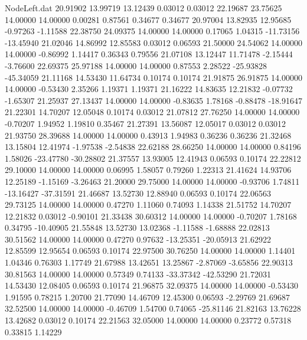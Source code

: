 \begin{filecontents}{NodeLeft.dat}
  20.91902   13.99719   13.12439     0.03012    0.03012   22.19687   23.75625   14.00000   14.00000    0.00281    0.87561    0.34677    0.34677
  20.97004   13.82935   12.95685    -0.97263   -1.11588   22.38750   24.09375   14.00000   14.00000    0.17065    1.04315  -11.73156  -13.45940
  21.02046   14.86992   12.85583     0.03012    0.06593   21.50000   24.54062   14.00000   14.00000   -0.86992    1.14417    0.36343    0.79556
  21.07108   13.12447   11.71478    -2.15444   -3.76600   22.69375   25.97188   14.00000   14.00000    0.87553    2.28522  -25.93828  -45.34059
  21.11168   14.53430   11.64734     0.10174    0.10174   21.91875   26.91875   14.00000   14.00000   -0.53430    2.35266    1.19371    1.19371
  21.16222   14.83635   12.21832    -0.07732   -1.65307   21.25937   27.13437   14.00000   14.00000   -0.83635    1.78168   -0.88478  -18.91647
  21.22301   14.70207   12.05048     0.10174    0.03012   21.07812   27.76250   14.00000   14.00000   -0.70207    1.94952    1.19810    0.35467
  21.27391   13.56087   12.05017     0.03012    0.03012   21.93750   28.39688   14.00000   14.00000    0.43913    1.94983    0.36236    0.36236
  21.32468   13.15804   12.41974    -1.97538   -2.54838   22.62188   28.66250   14.00000   14.00000    0.84196    1.58026  -23.47780  -30.28802
  21.37557   13.93005   12.41943     0.06593    0.10174   22.22812   29.10000   14.00000   14.00000    0.06995    1.58057    0.79260    1.22313
  21.41624   14.93706   12.25189    -1.15169   -3.26463   21.20000   29.75000   14.00000   14.00000   -0.93706    1.74811  -13.16427  -37.31591
  21.46687   13.52730   12.88940     0.06593    0.10174   22.06563   29.73125   14.00000   14.00000    0.47270    1.11060    0.74093    1.14338
  21.51752   14.70207   12.21832     0.03012   -0.90101   21.33438   30.60312   14.00000   14.00000   -0.70207    1.78168    0.34795  -10.40905
  21.55848   13.52730   13.02368    -1.11588   -1.68888   22.02813   30.51562   14.00000   14.00000    0.47270    0.97632  -13.25351  -20.05913
  21.62922   12.85599   12.95654     0.06593    0.10174   22.97500   30.76250   14.00000   14.00000    1.14401    1.04346    0.76303    1.17749
  21.67988   13.42651   13.25867    -2.87069   -3.65856   22.90313   30.81563   14.00000   14.00000    0.57349    0.74133  -33.37342  -42.53290
  21.72031   14.53430   12.08405     0.06593    0.10174   21.96875   32.09375   14.00000   14.00000   -0.53430    1.91595    0.78215    1.20700
  21.77090   14.46709   12.45300     0.06593   -2.29769   21.69687   32.52500   14.00000   14.00000   -0.46709    1.54700    0.74065  -25.81146
  21.82163   13.76228   13.42682     0.03012    0.10174   22.21563   32.05000   14.00000   14.00000    0.23772    0.57318    0.33815    1.14229

\end{filecontents}

